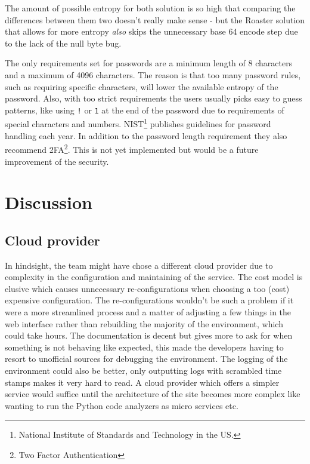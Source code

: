 \documentclass[12pt,a4paper]{report}
\begin{document}
The amount of possible entropy for both solution is so high that comparing the differences
between them two doesn't really make sense - but the Roaster solution that allows for more entropy
\textit{also} skips the unnecessary base 64 encode step due to the lack of the null byte bug.

The only requirements set for passwords are a minimum length of 8 characters and a maximum of 4096 characters. The reason is that too many password rules, such as requiring specific characters, will lower the available entropy of the password. Also, with too strict requirements the users usually picks easy to guess patterns, like using \texttt{!} or \texttt{1} at the end of the password due to requirements of special characters and numbers\cite{oauth-nist}. NIST\footnote{National Institute of Standards and Technology in the US.} publishes guidelines for password handling each year. In addition to the password length requirement they also recommend 2FA\footnote{Two Factor Authentication}\cite{nist-passwords}. This is not yet implemented but would be a future improvement of the security.

\chapter{Discussion}

\section{Cloud provider}
In hindsight, the team might have chose a different cloud provider due to complexity in the configuration and maintaining of the service. The cost model is elusive which causes unnecessary re-configurations when choosing a too (cost) expensive configuration. The re-configurations wouldn't be such a problem if it were a more streamlined process and a matter of adjusting a few things in the web interface rather than rebuilding the majority of the environment, which could take hours. The documentation is decent but gives more to ask for when something is not behaving like expected, this made the developers having to resort to unofficial sources for debugging the environment. The logging of the environment could also be better, only outputting logs with scrambled time stamps makes it very hard to read. A cloud provider which offers a simpler service would suffice until the architecture of the site becomes more complex like wanting to run the Python code analyzers as micro services etc.
\end{document}
